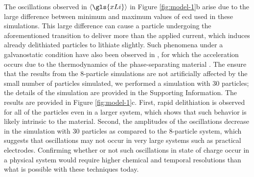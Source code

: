 \documentclass{article}
\begin{document}
The oscillations observed in $\left\langle \gls{xLi} \right\rangle$ in
Figure \ref{fig:model-1}b arise due to the large difference between
minimum and maximum values of \gls{ecd} used in these
simulations. This large difference can cause a particle undergoing the
aforementioned transition to deliver more than the applied current,
which induces already delithiated particles to lithiate slightly. Such
phenomena under a galvanostatic condition have also been observed in
, for which the acceleration occurs due to the
thermodynamics of the phase-separating material
\cite{thornton2015}. The ensure that the results from the 8-particle
simulations are not artificially affected by the small number of
particles simulated, we performed a simulation with 30 particles; the
details of the simulation are provided in the Supporting
Information. The results are provided in Figure
\ref{fig:model-1}c. First, rapid delithiation is observed for all of
the particles even in a larger system, which shows that such behavior
is likely intrinsic to the material. Second, the amplitudes of the
oscillations decrease in the simulation with 30 particles as compared
to the 8-particle system, which suggests that oscillations may not
occur in very large systems such as practical electrodes.  Confirming
whether or not such oscillations in state of charge occur in a
physical system would require higher chemical and temporal resolutions
than what is possible with these techniques today.
\end{document}
